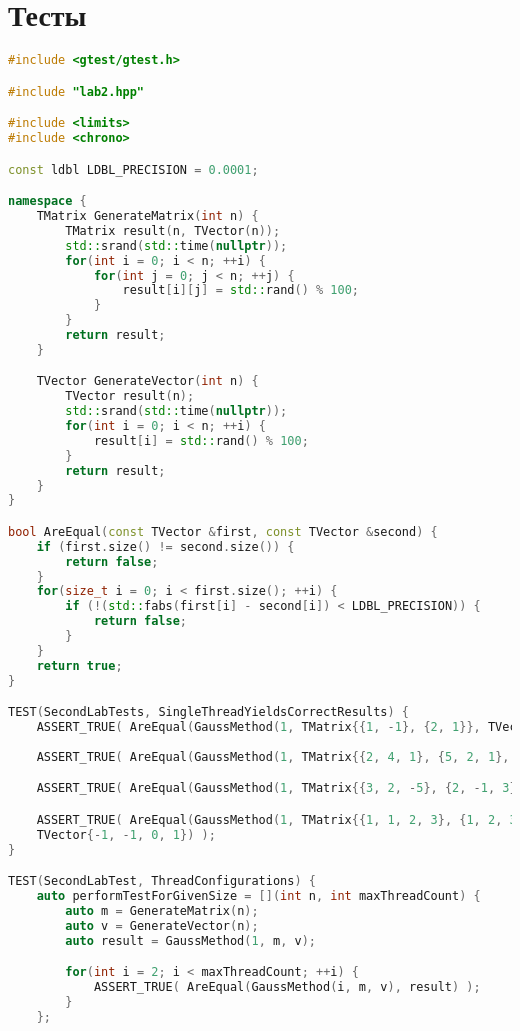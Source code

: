 \documentclass[a4paper, 12pt]{article}
\begin{document}
\section{Тесты}
\begin{lstlisting}[language=C++]
#include <gtest/gtest.h>

#include "lab2.hpp"

#include <limits>
#include <chrono>

const ldbl LDBL_PRECISION = 0.0001;

namespace {
    TMatrix GenerateMatrix(int n) {
        TMatrix result(n, TVector(n));
        std::srand(std::time(nullptr));
        for(int i = 0; i < n; ++i) {
            for(int j = 0; j < n; ++j) {
                result[i][j] = std::rand() % 100;
            }
        }
        return result;
    }

    TVector GenerateVector(int n) {
        TVector result(n);
        std::srand(std::time(nullptr));
        for(int i = 0; i < n; ++i) {
            result[i] = std::rand() % 100;
        }
        return result;
    }
}

bool AreEqual(const TVector &first, const TVector &second) {
    if (first.size() != second.size()) {
        return false;
    }
    for(size_t i = 0; i < first.size(); ++i) {
        if (!(std::fabs(first[i] - second[i]) < LDBL_PRECISION)) {
            return false;
        }
    }
    return true;
}

TEST(SecondLabTests, SingleThreadYieldsCorrectResults) {
    ASSERT_TRUE( AreEqual(GaussMethod(1, TMatrix{{1, -1}, {2, 1}}, TVector{-5, -7}), TVector{-4, 1}) );
    
    ASSERT_TRUE( AreEqual(GaussMethod(1, TMatrix{{2, 4, 1}, {5, 2, 1}, {2, 3, 4}}, TVector{36, 47, 37}), TVector{7, 5, 2}) );

    ASSERT_TRUE( AreEqual(GaussMethod(1, TMatrix{{3, 2, -5}, {2, -1, 3}, {1, 2, -1}}, TVector{-1, 13, 9}), TVector{3, 5, 4}) );

    ASSERT_TRUE( AreEqual(GaussMethod(1, TMatrix{{1, 1, 2, 3}, {1, 2, 3, -1}, {3, -1, -1, -2}, {2, 3, -1, -1}}, TVector{1, -4, -4, -6}),  
    TVector{-1, -1, 0, 1}) );
}

TEST(SecondLabTest, ThreadConfigurations) {
    auto performTestForGivenSize = [](int n, int maxThreadCount) {
        auto m = GenerateMatrix(n);
        auto v = GenerateVector(n);
        auto result = GaussMethod(1, m, v);

        for(int i = 2; i < maxThreadCount; ++i) {
            ASSERT_TRUE( AreEqual(GaussMethod(i, m, v), result) );
        }
    };


\end{lstlisting}
\end{document}
